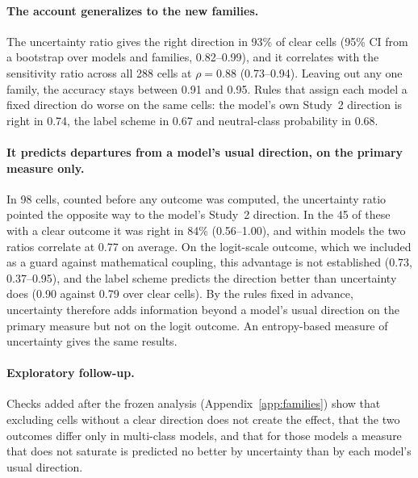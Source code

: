 \documentclass[runningheads]{llncs}
\begin{document}
\paragraph{The account generalizes to the new families.} The uncertainty ratio
gives the right direction in 93\% of clear cells (95\% CI from a bootstrap over
models and families, 0.82--0.99), and it correlates with the sensitivity ratio
across all 288 cells at $\rho=0.88$ (0.73--0.94). Leaving out any one family,
the accuracy stays between 0.91 and 0.95. Rules that assign each model a fixed
direction do worse on the same cells: the model's own Study~2 direction is right
in 0.74, the label scheme in 0.67 and neutral-class probability in 0.68.

\paragraph{It predicts departures from a model's usual direction, on the
primary measure only.} In 98 cells, counted before any outcome was computed, the
uncertainty ratio pointed the opposite way to the model's Study~2 direction. In
the 45 of these with a clear outcome it was right in 84\% (0.56--1.00), and
within models the two ratios correlate at 0.77 on average. On the logit-scale
outcome, which we included as a guard against mathematical coupling, this
advantage is not established (0.73, 0.37--0.95), and the label scheme predicts
the direction better than uncertainty does (0.90 against 0.79 over clear
cells). By the rules fixed in advance, uncertainty therefore adds information
beyond a model's usual direction on the primary measure but not on the logit
outcome. An entropy-based measure of uncertainty gives the same results.

\paragraph{Exploratory follow-up.} Checks added after the frozen analysis
(Appendix~\ref{app:families}) show that excluding cells without a clear
direction does not create the effect, that the two outcomes differ only in
multi-class models, and that for those models a measure that does not saturate
is predicted no better by uncertainty than by each model's usual direction.
\end{document}
